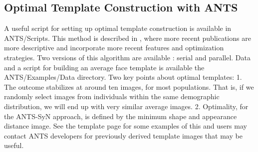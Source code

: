 \documentclass{InsightArticle}
\begin{document}
\subsection{Optimal Template Construction with ANTS}
A useful script for setting up optimal template construction
 is available in ANTS/Scripts.  This method is described in \cite{Avants2004,Avants2006d,Kim2008,Yushkevich2009}, 
where more recent publications are more descriptive and incorporate 
more recent features and optimization strategies. 
Two versions of this algorithm are available : serial and parallel.  
Data and a script for building an average face template is available 
the ANTS/Examples/Data directory.  Two key points about optimal templates:
1. The outcome stabilizes at around ten images, for most populations.
That is, if we randomly select images from individuals within the same 
demographic distribution, we will end up with very similar average images.  
2.  Optimality, for the ANTS-SyN approach, is defined by the minimum shape 
and appearance distance image. 
See the template page for some examples of this and users may 
contact ANTS developers for previously derived template 
images that may be useful. 
\end{document}
